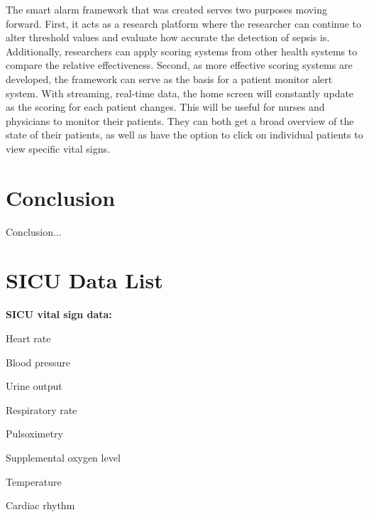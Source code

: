 \documentclass{sig-alternate}
\begin{document}
The smart alarm framework that was created serves two purposes moving forward.  First, it acts as a research platform where the researcher can continue to alter threshold values and evaluate how accurate the detection of sepsis is.  Additionally, researchers can apply scoring systems from other health systems to compare the relative effectiveness.  Second, as more effective scoring systems are developed, the framework can serve as the basis for a patient monitor alert system.  With streaming, real-time data, the home screen will constantly update as the scoring for each patient changes.  This will be useful for nurses and physicians to monitor their patients.  They can both get a broad overview of the state of their patients, as well as have the option to click on individual patients to view specific vital signs.

\vspace{10pt}
\section{Conclusion}
\vspace{10pt}
\label{sec:conclusion}

Conclusion...





\vspace{10pt}

\vspace{10pt}
\appendix
\section{SICU Data List}
\label{app:sicu_data}

\noindent \textbf{SICU vital sign data:}
\begin{itemize*}
  \item Heart rate \vspace{3pt}
  \item Blood pressure \vspace{3pt}
  \item Urine output \vspace{3pt}
  \item Respiratory rate \vspace{3pt}
  \item Pulsoximetry \vspace{3pt}
  \item Supplemental oxygen level \vspace{3pt}
  \item Temperature \vspace{3pt}
  \item Cardiac rhythm \vspace{20pt}
\end{itemize*}
\end{document}
